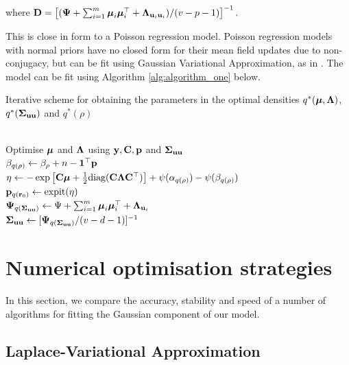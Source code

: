 \documentclass{article}[12pt]
\begin{document}
where ${\bf D} = \left[ ({\boldsymbol \Psi} + \sum_{i=1}^m {\boldsymbol \mu}_i {\boldsymbol \mu}_i^\top + {\boldsymbol \Lambda}_{{\bf u}_i{\bf u}_i}) / (v - p - 1) \right]^{-1}$. 

This is close in form to a Poisson regression model. Poisson regression models with normal priors have no
closed form for their mean field updates due to non- conjugacy, but can be fit using Gaussian Variational
Approximation, as in \citep{ormerod09}. The model can be fit using Algorithm \ref{alg:algorithm_one} below.

\begin{algorithm}
\caption[Algorithm 1]{Iterative scheme for obtaining the parameters in the
optimal densities $q^*({\boldsymbol \mu}, {\boldsymbol \Lambda})$, $q^*({\boldsymbol \Sigma}_{{\bf u} {\bf u}})$ and $q^*(\rho)$}
\label{alg:algorithm_one}
\begin{algorithmic}
 \\[1ex]
\STATE Optimise ${\boldsymbol \mu}$ and ${\boldsymbol \Lambda}$ using ${\bf y}, {\bf C}, {\bf p}$ and ${\boldsymbol \Sigma}_{{\bf u} {\bf u}}$ \\[1ex]
\STATE $\beta_{q(\rho)} \leftarrow \beta_\rho + n - {\bf 1}^\top{\bf p}$ \\[1ex]
\STATE $\eta \leftarrow -\exp \left [ {\bf C} {\boldsymbol \mu} + {\tfrac{1}{2}} \text{diag}{({\bf C}{\boldsymbol\Lambda}{\bf C}^\top)} \right ] + \psi{(\alpha_{q{(\rho)}})} - \psi{(\beta_{q{(\rho)}})}$ \\[1ex]
\STATE ${\bf p}_{q({\bf r}_0)} \leftarrow \text{expit} (\eta)$ \\[1ex]
\STATE ${\boldsymbol \Psi}_{q({\boldsymbol \Sigma}_{{\bf u} {\bf u}})} \leftarrow \Psi + \sum_{i=1}^m {\boldsymbol \mu}_i {\boldsymbol \mu}_i^\top + {\boldsymbol \Lambda}_{{{\bf u}}_i}$ \\[1ex]
\STATE ${\boldsymbol \Sigma}_{{\bf u}{\bf u}} \leftarrow [{\boldsymbol \Psi}_{q({\boldsymbol \Sigma}_{{\bf u} {\bf u}})}/(v - d - 1)]^{-1}$
\ENDWHILE
\end{algorithmic}
\end{algorithm}

\section{Numerical optimisation strategies}
\label{sec:algorithms}

In this section, we compare the accuracy, stability and speed of a number of algorithms for fitting the
Gaussian component of our model.

\subsection{Laplace-Variational Approximation}
\end{document}
